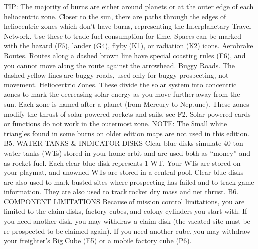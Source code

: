 \documentclass[a4paper]{book}
\begin{document}
TIP: The majority of burns are either around planets or at the outer edge of each heliocentric zone. Closer to the sun, there are paths through the edges of heliocentric zones which don’t have burns, representing the Interplanetary Travel Network. Use these to trade fuel consumption for time.
Spaces can be marked with the hazard (F5), lander (G4), flyby (K1), or radiation (K2) icons.
Aerobrake Routes. Routes along a dashed brown line have special coasting rules (F6), and you cannot move along the route against the arrowhead. 
Buggy Roads. The dashed yellow lines are buggy roads, used only for buggy prospecting, not movement.
Heliocentric Zones. These divide the solar system into concentric zones to mark the decreasing solar energy as you move further away from the sun. Each zone is named after a planet (from Mercury to Neptune). These zones modify the thrust of solar-powered rockets and sails, see F2. Solar-powered cards or functions do not work in the outermost zone.
NOTE: The Small white triangles found in some burns on older edition maps are not used in this edition.
B5. WATER TANKS \& INDICATOR DISKS
Clear blue disks simulate 40-ton water tanks (WTs) stored in your home orbit and are used both as “money” and as rocket fuel. Each clear blue disk represents 1 WT. Your WTs are stored on your playmat, and unowned WTs are stored in a central pool.
Clear blue disks are also used to mark busted sites where prospecting has failed and to track game information. They are also used to track rocket dry mass and net thrust.
B6. COMPONENT LIMITATIONS
Because of mission control limitations, you are limited to the claim disks, factory cubes, and colony cylinders you start with. If you need another disk, you may withdraw a claim disk (the vacated site must be re-prospected to be claimed again). If you need another cube, you may withdraw your freighter’s Big Cube (E5) or a mobile factory cube (P6).
\end{document}
